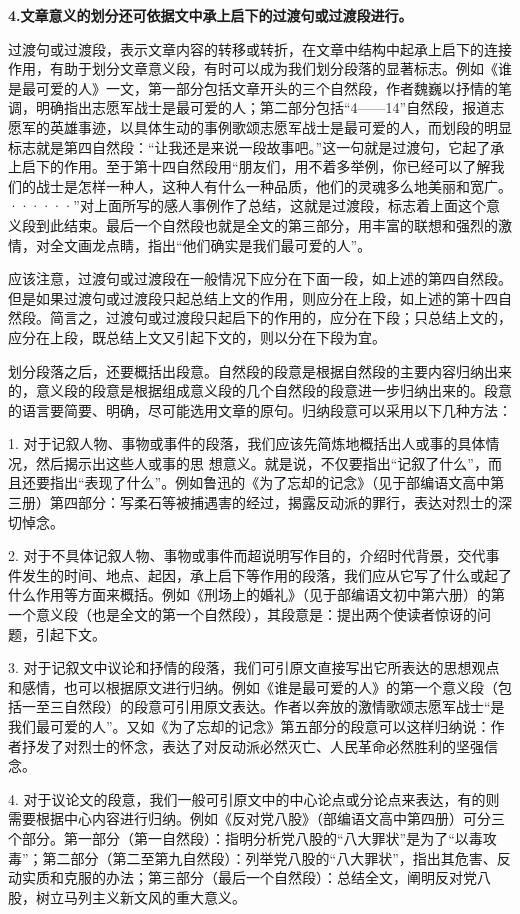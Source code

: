 \textbf{4.文章意义的划分还可依据文中承上启下的过渡句或过渡段进行。}

过渡句或过渡段，表示文章内容的转移或转折，在文章中结构中起承上启下的连接作用，有助于划分文章意义段，有时可以成为我们划分段落的显著标志。例如《谁是最可爱的人》一文，第一部分包括文章开头的三个自然段，作者魏巍以抒情的笔调，明确指出志愿军战士是最可爱的人；第二部分包括“4——14”自然段，报道志愿军的英雄事迹，以具体生动的事例歌颂志愿军战士是最可爱的人，而划段的明显标志就是第四自然段：“让我还是来说一段故事吧。”这一句就是过渡句，它起了承上启下的作用。至于第十四自然段用“朋友们，用不着多举例，你已经可以了解我们的战士是怎样一种人，这种人有什么一种品质，他们的灵魂多么地美丽和宽广。······”对上面所写的感人事例作了总结，这就是过渡段，标志着上面这个意义段到此结束。最后一个自然段也就是全文的第三部分，用丰富的联想和强烈的激情，对全文画龙点睛，指出“他们确实是我们最可爱的人”。

应该注意，过渡句或过渡段在一般情况下应分在下面一段，如上述的第四自然段。但是如果过渡句或过渡段只起总结上文的作用，则应分在上段，如上述的第十四自然段。简言之，过渡句或过渡段只起启下的作用的，应分在下段；只总结上文的，应分在上段，既总结上文又引起下文的，则以分在下段为宜。

划分段落之后，还要概括出段意。自然段的段意是根据自然段的主要内容归纳出来的，意义段的段意是根据组成意义段的几个自然段的段意进一步归纳出来的。段意的语言要简要、明确，尽可能选用文章的原句。归纳段意可以采用以下几种方法：

1. 对于记叙人物、事物或事件的段落，我们应该先简炼地概括出人或事的具体情况，然后揭示出这些人或事的思
想意义。就是说，不仅要指出“记叙了什么”，而且还要指出“表现了什么”。例如鲁迅的《为了忘却的记念》（见于部编语文高中第三册）第四部分：写柔石等被捕遇害的经过，揭露反动派的罪行，表达对烈士的深切悼念。

2. 对于不具体记叙人物、事物或事件而超说明写作目的，介绍时代背景，交代事件发生的时间、地点、起因，承上启下等作用的段落，我们应从它写了什么或起了什么作用等方面来概括。例如《刑场上的婚礼》（见于部编语文初中第六册）的第一个意义段（也是全文的第一个自然段），其段意是：提出两个使读者惊讶的问题，引起下文。

3. 对于记叙文中议论和抒情的段落，我们可引原文直接写出它所表达的思想观点和感情，也可以根据原文进行归纳。例如《谁是最可爱的人》的第一个意义段（包括一至三自然段）的段意可引用原文表达。作者以奔放的激情歌颂志愿军战士“是我们最可爱的人”。又如《为了忘却的记念》第五部分的段意可以这样归纳说：作者抒发了对烈士的怀念，表达了对反动派必然灭亡、人民革命必然胜利的坚强信念。

4. 对于议论文的段意，我们一般可引原文中的中心论点或分论点来表达，有的则需要根据中心内容进行归纳。例如《反对党八股》（部编语文高中第四册）可分三个部分。第一部分（第一自然段）：指明分析党八股的“八大罪状”是为了“以毒攻毒”；第二部分（第二至第九自然段）：列举党八股的“八大罪状”，指出其危害、反动实质和克服的办法；第三部分（最后一个自然段）：总结全文，阐明反对党八股，树立马列主义新文风的重大意义。

